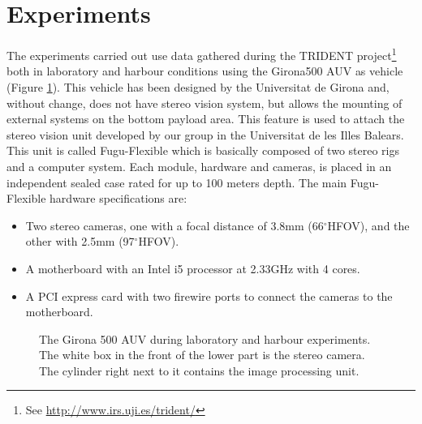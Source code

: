\documentclass[conference]{IEEEtran}
\newcommand{\degree}{\ensuremath{^\circ}}
\begin{document}
\section{Experiments
  \label{experiments}
}

The experiments carried out use data gathered during the TRIDENT project\footnote{See \url{http://www.irs.uji.es/trident/}} both in laboratory and harbour conditions using the Girona500 AUV \cite{Ribas2012} as vehicle (Figure \ref{g500}). This vehicle has been designed by the Universitat de Girona and, without change, does not have stereo vision system, but allows the mounting of external systems on the bottom payload area. This feature is used to attach the stereo vision unit developed by our group in the Universitat de les Illes Balears. This unit is called Fugu-Flexible which is basically composed of two stereo rigs and a computer system. Each module, hardware and cameras, is placed in an independent sealed case rated for up to 100 meters depth. The main Fugu-Flexible hardware specifications are:

\begin{itemize}
  \item Two stereo cameras, one with a focal distance of 3.8mm (66\degree HFOV), and the other with 2.5mm (97\degree HFOV). %
  \item A motherboard with an Intel i5 processor at 2.33GHz with 4 cores.
  \item A PCI express card with two firewire ports to connect the cameras to the motherboard.
\end{itemize}

\begin{figure}
  \noindent{}
  \caption{The Girona 500 AUV during laboratory and harbour experiments. The white box in the front of the lower part is the stereo camera. The cylinder right next to it contains the image processing unit.}
  \label{g500}
\end{figure}
\end{document}
